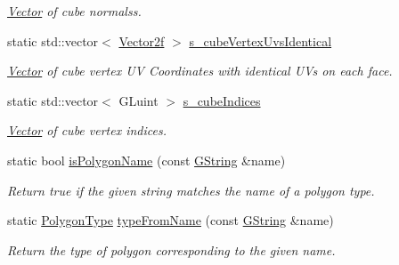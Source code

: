 \begin{DoxyCompactItemize}
\begin{DoxyCompactList}\small\item\em \mbox{\hyperlink{classrev_1_1_vector}{Vector}} of cube normalss. \end{DoxyCompactList}\item 
static std\+::vector$<$ \mbox{\hyperlink{classrev_1_1_vector}{Vector2f}} $>$ \mbox{\hyperlink{classrev_1_1_polygon_cache_af0abd3db7b87cf401996e4bdd6601cb3}{s\+\_\+cube\+Vertex\+Uvs\+Identical}}
\begin{DoxyCompactList}\small\item\em \mbox{\hyperlink{classrev_1_1_vector}{Vector}} of cube vertex UV Coordinates with identical U\+Vs on each face. \end{DoxyCompactList}\item 
static std\+::vector$<$ G\+Luint $>$ \mbox{\hyperlink{classrev_1_1_polygon_cache_a08172cb0065024482d30c724e071292c}{s\+\_\+cube\+Indices}}
\begin{DoxyCompactList}\small\item\em \mbox{\hyperlink{classrev_1_1_vector}{Vector}} of cube vertex indices. \end{DoxyCompactList}\item 
\mbox{\label{classrev_1_1_polygon_cache_a03a078e68c5493236d02c8fddef517a1}} 
static bool \mbox{\hyperlink{classrev_1_1_polygon_cache_a03a078e68c5493236d02c8fddef517a1}{is\+Polygon\+Name}} (const \mbox{\hyperlink{classrev_1_1_g_string}{G\+String}} \&name)
\begin{DoxyCompactList}\small\item\em Return true if the given string matches the name of a polygon type. \end{DoxyCompactList}\item 
\mbox{\label{classrev_1_1_polygon_cache_aeb34f3488bb4a94da21aef3ff6e202ca}} 
static \mbox{\hyperlink{classrev_1_1_polygon_cache_a08f12f93c70a2b00886877090312d106}{Polygon\+Type}} \mbox{\hyperlink{classrev_1_1_polygon_cache_aeb34f3488bb4a94da21aef3ff6e202ca}{type\+From\+Name}} (const \mbox{\hyperlink{classrev_1_1_g_string}{G\+String}} \&name)
\begin{DoxyCompactList}\small\item\em Return the type of polygon corresponding to the given name. \end{DoxyCompactList}\end{DoxyCompactItemize}


